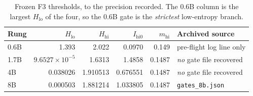 \documentclass[11pt,a4paper]{article}
\begin{document}
\begin{table}[h]
\centering
\small
\caption{Frozen F3 thresholds, to the precision recorded. The 0.6B column is the largest
$H_{\mathrm{lo}}$ of the four, so the 0.6B gate is the \emph{strictest} low-entropy branch.}
\label{tab:s1}
\begin{tabular}{@{}lrrrrl@{}}
\toprule
\textbf{Rung} & $H_{\mathrm{lo}}$ & $H_{\mathrm{hi}}$ & $I_{\mathrm{hi0}}$ & $m_{\mathrm{hi}}$ & \textbf{Archived source} \\
\midrule
0.6B & 1.393 & 2.022 & 0.0970 & 0.149 & pre-flight log line only \\
1.7B & $9.6527\times10^{-5}$ & 1.6313 & 1.4858 & 0.1487 & \emph{no} gate file recovered \\
4B & 0.038026 & 1.910513 & 0.676551 & 0.1487 & \emph{no} gate file recovered \\
8B & 0.000503 & 1.881214 & 1.033805 & 0.1487 & \texttt{gates\_8b.json} \\
\bottomrule
\end{tabular}
\end{table}
\end{document}
